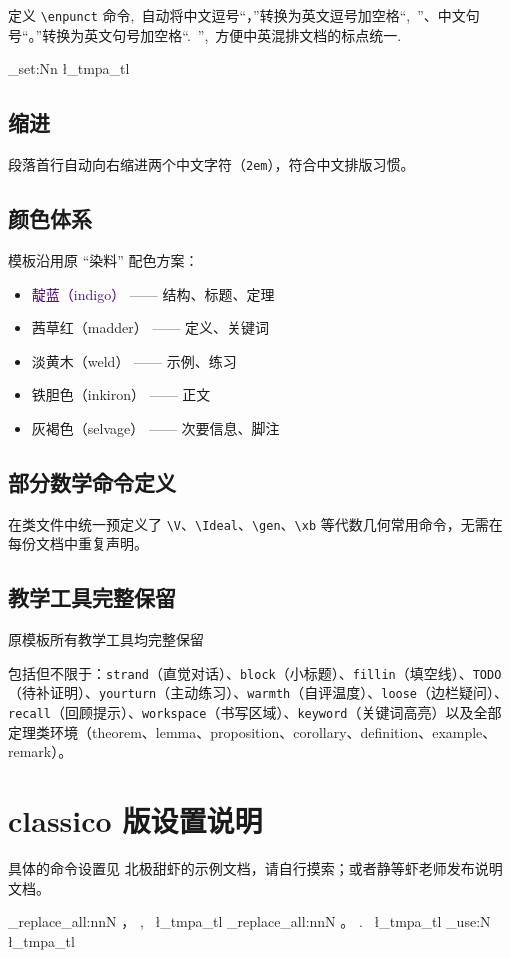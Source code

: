 \documentclass[cjk]{loom}
\newcommand{\enpunct}[1]{%
  \tl_set:Nn \l_tmpa_tl {#1}
  \regex_replace_all:nnN {，} {,\ } \l_tmpa_tl %
  \regex_replace_all:nnN {。} {.\ } \l_tmpa_tl %
  \tl_use:N \l_tmpa_tl
}
\begin{document}
定义 \texttt{\textbackslash enpunct} 命令,\ 自动将中文逗号“，”转换为英文逗号加空格“,\ ”、中文句号“。”转换为英文句号加空格“.\ ”,\ 方便中英混排文档的标点统一.

\enpunct{

\subsection{缩进}

段落首行自动向右缩进两个中文字符（\texttt{2em}），符合中文排版习惯。

\subsection{颜色体系}

模板沿用原 “染料” 配色方案：
\begin{itemize}
  \item \textcolor{indigo}{靛蓝（indigo）} —— 结构、标题、定理
  \item \textcolor{madder}{茜草红（madder）} —— 定义、关键词
  \item \textcolor{weld}{淡黄木（weld）} —— 示例、练习
  \item \textcolor{inkiron}{铁胆色（inkiron）} —— 正文
  \item \textcolor{selvage}{灰褐色（selvage）} —— 次要信息、脚注
\end{itemize}

\subsection{部分数学命令定义}

在类文件中统一预定义了 \texttt{\textbackslash V}、\texttt{\textbackslash Ideal}、\texttt{\textbackslash gen}、\texttt{\textbackslash xb} 等代数几何常用命令，无需在每份文档中重复声明。

\subsection{教学工具完整保留} \textcolor{selvage}{原模板所有教学工具均完整保留}

包括但不限于：\texttt{strand}（直觉对话）、\texttt{block}（小标题）、\texttt{fillin}（填空线）、\texttt{TODO}（待补证明）、\texttt{yourturn}（主动练习）、\texttt{warmth}（自评温度）、\texttt{loose}（边栏疑问）、\texttt{recall}（回顾提示）、\texttt{workspace}（书写区域）、\texttt{keyword}（关键词高亮）以及全部定理类环境（theorem、lemma、proposition、corollary、definition、example、remark）。

\section{classico 版设置说明}

具体的命令设置见 \textcolor{madder}{北极甜虾}的示例文档，请自行摸索；或者静等虾老师发布说明文档。

}
\end{document}
